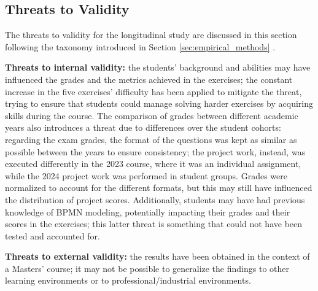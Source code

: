 

\subsection{Threats to Validity}

The threats to validity for the longitudinal study are discussed in this section following the taxonomy introduced in Section \ref{sec:empirical_methods} \cite{wohlin2012experimentation}.

\textbf{Threats to internal validity:} the students' background and abilities may have influenced the grades and the metrics achieved in the exercises; the constant increase in the five exercises' difficulty has been applied to mitigate the threat, trying to ensure that students could manage solving harder exercises by acquiring skills during the course. The comparison of grades between different academic years also introduces a threat due to differences over the student cohorts: regarding the exam grades, the format of the questions was kept as similar as possible between the years to ensure consistency; the project work, instead, was executed differently in the 2023 course, where it was an individual assignment, while the 2024 project work was performed in student groups. Grades were normalized to account for the different formats, but this may still have influenced the distribution of project scores. Additionally, students may have had previous knowledge of BPMN modeling, potentially impacting their grades and their scores in the exercises; this latter threat is something that could not have been tested and accounted for.

\textbf{Threats to external validity:} the results have been obtained in the context of a Masters' course; it may not be possible to generalize the findings to other learning environments or to professional/industrial environments.

